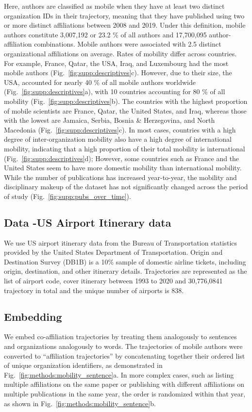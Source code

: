 \documentclass[12pt]{article} %
\begin{document}
Here, authors are classified as mobile when they have at least two distinct organization IDs in their trajectory, meaning that they have published using two or more distinct affiliations between 2008 and 2019.
Under this definition, mobile authors constitute 3,007,192 or 23.2 \% of all authors and 17,700,095 author-affiliation combinations.
Mobile authors were associated with 2.5 distinct organizational affiliations on average.
Rates of mobility differ across countries.
For example, France, Qatar, the USA, Iraq, and Luxembourg had the most mobile authors (Fig.~\ref{fig:supp:descriptives}c).
However, due to their size, the USA, accounted for nearly 40 \% of all mobile authors worldwide (Fig.~\ref{fig:supp:descriptives}a), with 10 countries accounting for 80 \% of all mobility (Fig.~\ref{fig:supp:descriptives}b).
The countries with the highest proportion of mobile scientists are France, Qatar, the United States, and Iraq, whereas those with the lowest are Jamaica, Serbia, Bosnia \& Herzegovina, and North Macedonia (Fig.~\ref{fig:supp:descriptives}c).
In most cases, countries with a high degree of inter-organization mobility also have a high degree of international mobility, indicating that a high proportion of their total mobility is international (Fig.~\ref{fig:supp:descriptives}d);
However, some countries such as France and the United States seem to have more domestic mobility than international mobility.
While the number of publications has increased year-to-year, the mobility and disciplinary makeup of the dataset has not significantly changed across the period of study (Fig.~\ref{fig:supp:pubs_over_time}).

\subsection*{Data -US Airport Itinerary data}
We use US airport itinerary data from the Bureau of Transportation statistics provided by the United States Department of Transportation. Origin and Destination Survey (DB1B) is a 10\% sample of domestic airline tickets, including origin, destination, and other itinerary details. Trajectories are represented as the list of airport code, cover itinerary between 1993 to 2020 and 30,776,0841 trajectory in total and the unique number of airports is 838.





\subsection*{Embedding}
We embed co-affiliation trajectories by treating them analogously to sentences and organizations analogously to words. 
The trajectories of mobile authors were converted to ``affiliation trajectories'' by concatenating together their ordered list of unique organization identifiers, as demonstrated in Fig.~\ref{fig:methods:mobility_sentence}a.
In more complex cases, such as listing multiple affiliations on the same paper or publishing with different affiliations on multiple publications in the same year, the order is randomized within that year, as shown in  Fig.~\ref{fig:methods:mobility_sentence}b.
\end{document}
